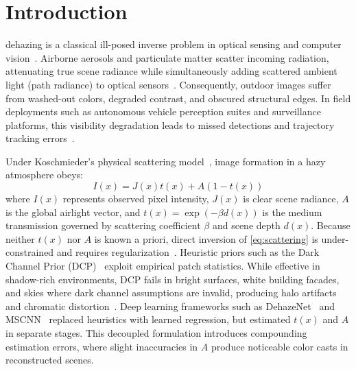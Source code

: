 \documentclass[journal]{IEEEtran}
\begin{document}
\section{Introduction}
 dehazing is a classical ill-posed inverse problem in optical sensing and computer vision~\cite{he2011dark,fattal2008single,cai2016dehazenet}. Airborne aerosols and particulate matter scatter incoming radiation, attenuating true scene radiance while simultaneously adding scattered ambient light (path radiance) to optical sensors~\cite{cai2016dehazenet,ren2016single}. Consequently, outdoor images suffer from washed-out colors, degraded contrast, and obscured structural edges. In field deployments such as autonomous vehicle perception suites and surveillance platforms, this visibility degradation leads to missed detections and trajectory tracking errors~\cite{cai2016dehazenet,li2017aod}.

Under Koschmieder's physical scattering model~\cite{koschmieder1924theorie}, image formation in a hazy atmosphere obeys:
\begin{equation}
I(x) = J(x)t(x) + A(1 - t(x))
\label{eq:scattering}
\end{equation}
where $I(x)$ represents observed pixel intensity, $J(x)$ is clear scene radiance, $A$ is the global airlight vector, and $t(x) = \exp(-\beta d(x))$ is the medium transmission governed by scattering coefficient $\beta$ and scene depth $d(x)$. Because neither $t(x)$ nor $A$ is known a priori, direct inversion of \eqref{eq:scattering} is under-constrained and requires regularization~\cite{he2011dark,ren2016single}. Heuristic priors such as the Dark Channel Prior (DCP)~\cite{he2011dark} exploit empirical patch statistics. While effective in shadow-rich environments, DCP fails in bright surfaces, white building facades, and skies where dark channel assumptions are invalid, producing halo artifacts and chromatic distortion~\cite{he2013guided}. Deep learning frameworks such as DehazeNet~\cite{cai2016dehazenet} and MSCNN~\cite{ren2016single} replaced heuristics with learned regression, but estimated $t(x)$ and $A$ in separate stages. This decoupled formulation introduces compounding estimation errors, where slight inaccuracies in $A$ produce noticeable color casts in reconstructed scenes.
\end{document}
